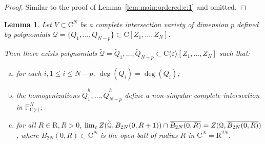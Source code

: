 \documentclass[10pt]{amsart}
\newtheorem{lemma}{Lemma}[section]
\theoremstyle{definition}
\theoremstyle{remark}
\numberwithin{equation}{section}
\newcommand {\R} {\mathrm{R}}
\newcommand {\C}     {\mathrm{C}}
\newcommand {\ZZ} {{\rm Z}}
\newcommand {\la}   {{\langle}}
\newcommand {\ra}   {{\rangle}}
\newcommand {\eps} {{\varepsilon}}
\newcommand {\PP}     {\mathbb{P}} %
\begin{document}
\begin{proof}
    Similar to the proof of Lemma~\ref{lem:main:ordered:c:1} and omitted.
\end{proof}




\begin{lemma}
\label{lem:main:ordered:c':2}
    Let $V \subset \C^N$ be a complete intersection variety of dimension $p$ defined by polynomials 
    $\mathcal{Q} = \{Q_1,\ldots,Q_{N-p}\} \subset \C[Z_1,\ldots,Z_N]$.
    
    Then there exists polynomials 
    $\widetilde{\mathcal{Q}} = \widetilde{Q}_{1},\ldots,\widetilde{Q}_{N-p} \subset \C\la\eps\ra[Z_1,\ldots,Z_N]$ such that:
    \begin{enumerate}[(a)]
    \item 
    \label{itemlabel:lem:main:ordered:c:1:a}
    for each $i, 1\leq i \leq N-p$, $\deg(\widetilde{Q}_i) = \deg(Q_i)$;
    \item 
    \label{itemlabel:lem:main:ordered:c:1:b}
    the homogenizations $\widetilde{Q}_1^h,\ldots,\widetilde{Q}_{N-p}^h$ define a non-singular complete intersection in $\PP_{\C\la\eps\ra}^{N}$;
    \item 
    \label{itemlabel:lem:main:ordered:c:1:c}
    for all $R \in \R, R > 0$,  
    $\lim_\eps \ZZ(\widetilde{\mathcal{Q}},B_{2N}(0,R+1)) \cap \overline{B_{2N}(0,R)} = \ZZ(\mathcal{Q},\overline{B_{2N}(0,R)})$,
    where
    $B_{2N}(0,R) \subset \C^N$ is the open ball of radius $R$ in $\C^N = \R^{2 N}$.
    \end{enumerate}
\end{lemma}
\end{document}
